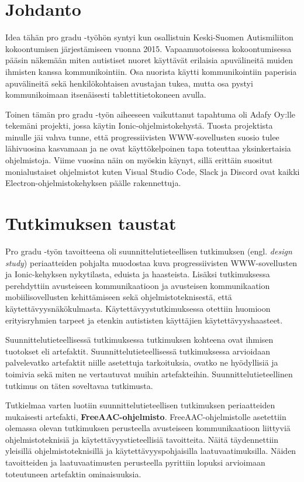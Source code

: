 \documentclass[utf8]{gradu3}
\begin{document}
\mainmatter

\chapter{Johdanto}

Idea tähän pro gradu -työhön syntyi kun osallistuin Keski-Suomen Autismiliiton kokoontumisen järjestämiseen vuonna 2015. Vapaamuotoisessa kokoontumisessa pääsin näkemään miten autistiset nuoret käyttävät erilaisia apuvälineitä muiden ihmisten kanssa kommunikointiin. Osa nuorista käytti kommunikointiin paperisia apuvälineitä sekä henkilökohtaisen avustajan tukea, mutta osa pystyi kommunikoimaan itsenäisesti tablettitietokoneen avulla.

Toinen tämän pro gradu -työn aiheeseen vaikuttanut tapahtuma oli Adafy Oy:lle tekemäni projekti, jossa käytin Ionic-ohjelmistokehystä. Tuosta projektista minulle jäi vahva tunne, että progressiivisten WWW-sovellusten suosio tulee lähivuosina kasvamaan ja ne ovat käyttökelpoinen tapa toteuttaa yksinkertaisia ohjelmistoja. Viime vuosina näin on myöskin käynyt, sillä erittäin suositut monialustaiset ohjelmistot kuten Visual Studio Code, Slack ja Discord ovat kaikki Electron-ohjelmistokehyksen päälle rakennettuja.


\chapter{Tutkimuksen taustat}

Pro gradu -työn tavoitteena oli suunnittelutieteellisen tutkimuksen (engl. \textit{design study}) periaatteiden pohjalta muodostaa kuva progressiivisten WWW-sovellusten ja Ionic-kehyksen nykytilasta, eduista ja haasteista. Lisäksi tutkimuksessa perehdyttiin avusteiseen kommunikaatioon ja avusteisen kommunikaation mobiilisovellusten kehittämiseen sekä ohjelmistoteknisestä, että käytettävyysnäkökulmasta. Käytettävyystutkimuksessa otettiin huomioon erityisryhmien tarpeet ja etenkin autististen käyttäjien käytettävyyshaasteet.

Suunnittelutieteellisessä tutkimuksessa tutkimuksen kohteena ovat ihmisen tuotokset eli artefaktit. Suunnittelutieteellisessä tutkimuksessa arvioidaan palvelevatko artefaktit niille asetettuja tarkoituksia, ovatko ne hyödyllisiä ja toimivia sekä miten ne vertautuvat muihin artefakteihin. Suunnittelutieteellinen tutkimus on täten soveltavaa tutkimusta.

Tutkielmaa varten luotiin suunnittelutieteellisen tutkimuksen periaatteiden mukaisesti artefakti, \textbf{FreeAAC-ohjelmisto}. FreeAAC-ohjelmistolle asetettiin olemassa olevan tutkimuksen perusteella avusteiseen kommunikaatioon liittyviä ohjelmistoteknisiä ja käytettävyystieteellisiä tavoitteita. Näitä täydennettiin yleisillä ohjelmistoteknisillä ja käytettävyyspohjaisilla laatuvaatimuksilla. Näiden tavoitteiden ja laatuvaatimusten perusteella pyrittiin lopuksi arvioimaan toteutuneen artefaktin ominaisuuksia.
\end{document}
